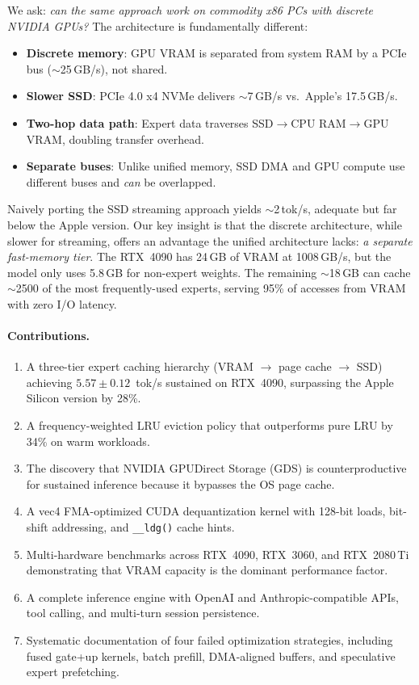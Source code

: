 \documentclass[11pt]{article}
\begin{document}
We ask: \emph{can the same approach work on commodity x86 PCs with discrete NVIDIA GPUs?} The architecture is fundamentally different:

\begin{itemize}[nosep]
    \item \textbf{Discrete memory}: GPU VRAM is separated from system RAM by a PCIe bus ($\sim$25\,GB/s), not shared.
    \item \textbf{Slower SSD}: PCIe 4.0 x4 NVMe delivers $\sim$7\,GB/s vs.\ Apple's 17.5\,GB/s.
    \item \textbf{Two-hop data path}: Expert data traverses SSD$\to$CPU RAM$\to$GPU VRAM, doubling transfer overhead.
    \item \textbf{Separate buses}: Unlike unified memory, SSD DMA and GPU compute use different buses and \emph{can} be overlapped.
\end{itemize}

Naively porting the SSD streaming approach yields $\sim$2\,tok/s, adequate but far below the Apple version. Our key insight is that the discrete architecture, while slower for streaming, offers an advantage the unified architecture lacks: \emph{a separate fast-memory tier}. The RTX~4090 has 24\,GB of VRAM at 1008\,GB/s, but the model only uses 5.8\,GB for non-expert weights. The remaining $\sim$18\,GB can cache $\sim$2500 of the most frequently-used experts, serving 95\% of accesses from VRAM with zero I/O latency.

\paragraph{Contributions.}
\begin{enumerate}[nosep]
    \item A three-tier expert caching hierarchy (VRAM $\to$ page cache $\to$ SSD) achieving $5.57 \pm 0.12$~tok/s sustained on RTX~4090, surpassing the Apple Silicon version by 28\%.
    \item A frequency-weighted LRU eviction policy that outperforms pure LRU by 34\% on warm workloads.
    \item The discovery that NVIDIA GPUDirect Storage (GDS) is counterproductive for sustained inference because it bypasses the OS page cache.
    \item A vec4 FMA-optimized CUDA dequantization kernel with 128-bit loads, bit-shift addressing, and \texttt{\_\_ldg()} cache hints.
    \item Multi-hardware benchmarks across RTX~4090, RTX~3060, and RTX~2080\,Ti demonstrating that VRAM capacity is the dominant performance factor.
    \item A complete inference engine with OpenAI and Anthropic-compatible APIs, tool calling, and multi-turn session persistence.
    \item Systematic documentation of four failed optimization strategies, including fused gate+up kernels, batch prefill, DMA-aligned buffers, and speculative expert prefetching.
\end{enumerate}
\end{document}
